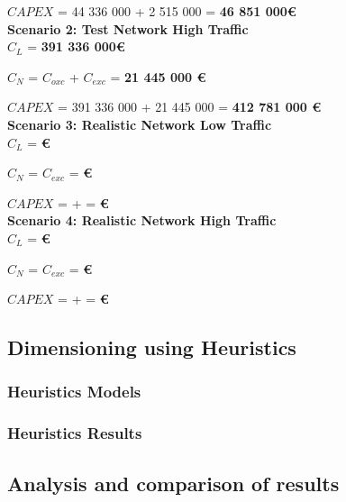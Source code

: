 $CAPEX$ = 44 336 000 + 2 515 000 = \textbf{46 851 000\euro}\\

\textbf{Scenario 2: Test Network High Traffic} \label{Scenario2_transp} \\

$C_L$ = \textbf{391 336 000\euro}

$C_N$ = $C_{oxc}$ + $C_{exc}$ = \textbf{21 445 000 \euro}

$CAPEX$ = 391 336 000 + 21 445 000 = \textbf{412 781 000 \euro}\\

\textbf{Scenario 3: Realistic Network Low Traffic} \label{Scenario3_transp} \\

$C_L$ = \textbf{\euro}

$C_N$ = $C_{exc}$ = \textbf{\euro}

$CAPEX$ =  +  = \textbf{\euro}\\

\textbf{Scenario 4: Realistic Network High Traffic} \label{Scenario4_transp} \\

$C_L$ = \textbf{\euro}

$C_N$ = $C_{exc}$ = \textbf{ \euro}

$CAPEX$ =  +  = \textbf{ \euro}\\


\subsection{Dimensioning using Heuristics}

\subsubsection{Heuristics Models}

\subsubsection{Heuristics Results}

\subsection{Analysis and comparison of results} 